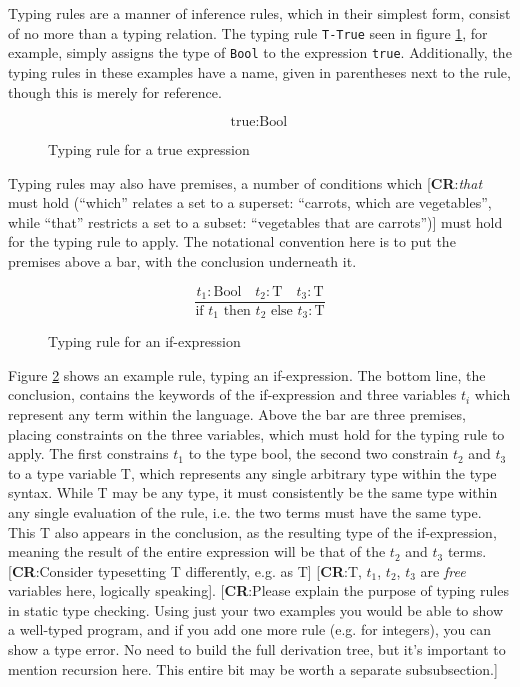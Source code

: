 \documentclass[nofilelist]{cslthse-msc}
\newcommand{\CR}[1]{\textcolor{green!60!black}{[\textbf{CR}:#1]}}
\begin{document}
Typing rules are a manner of inference rules, which in their simplest form, consist of no more than a typing relation.
The typing rule \lstinline{T-True} seen in figure \ref{typingruleexampletrue}, for example, simply assigns the type of \lstinline{Bool} to the expression \lstinline{true}.
Additionally, the typing rules in these examples have a name, given in parentheses next to the rule, though this is merely for reference.

\begin{figure}[h]
  \begin{equation}
    \tag{T-True}
    \text{true} : \text{Bool}
  \end{equation}
  \caption{Typing rule for a true expression}
  \label{typingruleexampletrue}
\end{figure}

Typing rules may also have premises, a number of conditions which \CR{\emph{that} must hold (``which'' relates a set to a superset: ``carrots, which are vegetables'', while ``that'' restricts a set to a subset: ``vegetables that are carrots'')} must hold for the typing rule to apply.
The notational convention here is to put the premises above a bar, with the conclusion underneath it.

\begin{figure}[h]
  \begin{equation}
    \tag{T-If}
    \frac{
      t_1 : \text{Bool}\quad
      t_2 : \text{T}\quad
      t_3 : \text{T}
    }{
      \text{if } t_1 \text{ then } t_2 \text{ else } t_3 : \text{T}
    }
  \end{equation}
  \caption{Typing rule for an if-expression}
  \label{typingruleexampleif}
\end{figure}

Figure \ref{typingruleexampleif} shows an example rule, typing an if-expression.
The bottom line, the conclusion, contains the keywords of the if-expression and three variables $t_i$ which represent any term within the language.
Above the bar are three premises, placing constraints on the three variables, which must hold for the typing rule to apply.
The first constrains $t_1$ to the type bool, the second two constrain $t_2$ and $t_3$ to a type variable T, which represents any single arbitrary type within the type syntax.
While T may be any type, it must consistently be the same type within any single evaluation of the rule, i.e. the two terms must have the same type.
This T also appears in the conclusion, as the resulting type of the if-expression, meaning the result of the entire expression will be that of the $t_2$ and $t_3$ terms.
\newcommand{\ty}[1]{\textcolor{blue!20!black}{\textsf{#1}}}
\newcommand{\tyvar}[1]{\ty{\textcolor{cyan!50!black}{#1}}}
\CR{Consider typesetting T differently, e.g. as \tyvar{T}}
\CR{\tyvar{T}, $t_1$, $t_2$, $t_3$ are \emph{free} variables here, logically speaking}.
\CR{Please explain the purpose of typing rules in static type checking.  Using just your two examples you would be able to
  show a well-typed program, and if you add one more rule (e.g. for integers), you can show a type error.  No need to build
  the full derivation tree, but it's important to mention recursion here.  This entire bit may be worth a separate subsubsection.}
\end{document}
